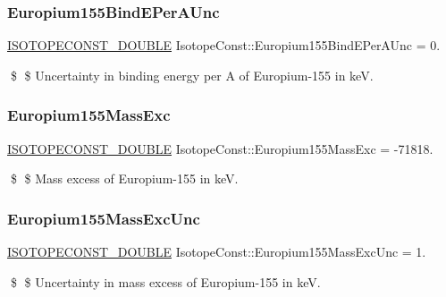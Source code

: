 \subsubsection{\texorpdfstring{Europium155\+Bind\+E\+Per\+A\+Unc}{Europium155BindEPerAUnc}}
{\footnotesize\ttfamily \mbox{\hyperlink{group___isotope_const-_macros_ga8f45a7272ce02c0b4c65c44636ed719a}{I\+S\+O\+T\+O\+P\+E\+C\+O\+N\+S\+T\+\_\+\+D\+O\+U\+B\+LE}} Isotope\+Const\+::\+Europium155\+Bind\+E\+Per\+A\+Unc = 0.}

\$ \$ Uncertainty in binding energy per A of Europium-\/155 in keV. \mbox{\label{group___isotope_const-_europium-_eu155_gaf99fef43a8d2031d842fd48cfcff701f}} 
\subsubsection{\texorpdfstring{Europium155\+Mass\+Exc}{Europium155MassExc}}
{\footnotesize\ttfamily \mbox{\hyperlink{group___isotope_const-_macros_ga8f45a7272ce02c0b4c65c44636ed719a}{I\+S\+O\+T\+O\+P\+E\+C\+O\+N\+S\+T\+\_\+\+D\+O\+U\+B\+LE}} Isotope\+Const\+::\+Europium155\+Mass\+Exc = -\/71818.}

\$ \$ Mass excess of Europium-\/155 in keV. \mbox{\label{group___isotope_const-_europium-_eu155_gabe0c9dc0f9c3633f8cc5ec0e500853fe}} 
\subsubsection{\texorpdfstring{Europium155\+Mass\+Exc\+Unc}{Europium155MassExcUnc}}
{\footnotesize\ttfamily \mbox{\hyperlink{group___isotope_const-_macros_ga8f45a7272ce02c0b4c65c44636ed719a}{I\+S\+O\+T\+O\+P\+E\+C\+O\+N\+S\+T\+\_\+\+D\+O\+U\+B\+LE}} Isotope\+Const\+::\+Europium155\+Mass\+Exc\+Unc = 1.}

\$ \$ Uncertainty in mass excess of Europium-\/155 in keV. \mbox{\label{group___isotope_const-_europium-_eu155_ga861bbff5504313831ddcfaa08d33e618}} 
